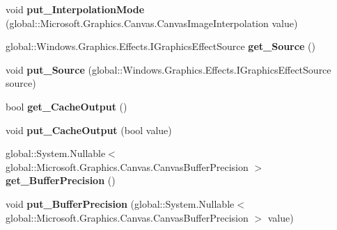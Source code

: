 \begin{DoxyCompactItemize}
void {\bfseries put\+\_\+\+Interpolation\+Mode} (global\+::\+Microsoft.\+Graphics.\+Canvas.\+Canvas\+Image\+Interpolation value)
\item 
\mbox{\label{class_microsoft_1_1_graphics_1_1_canvas_1_1_effects_1_1_straighten_effect_afc5cddafd3cf6b76344d67cd56c344ce}} 
global\+::\+Windows.\+Graphics.\+Effects.\+I\+Graphics\+Effect\+Source {\bfseries get\+\_\+\+Source} ()
\item 
\mbox{\label{class_microsoft_1_1_graphics_1_1_canvas_1_1_effects_1_1_straighten_effect_a7b9aaa626d56da821740097951cd1c38}} 
void {\bfseries put\+\_\+\+Source} (global\+::\+Windows.\+Graphics.\+Effects.\+I\+Graphics\+Effect\+Source source)
\item 
\mbox{\label{class_microsoft_1_1_graphics_1_1_canvas_1_1_effects_1_1_straighten_effect_aa6bcc6219eb494a9aaa6dff927bbf52f}} 
bool {\bfseries get\+\_\+\+Cache\+Output} ()
\item 
\mbox{\label{class_microsoft_1_1_graphics_1_1_canvas_1_1_effects_1_1_straighten_effect_a08dc50002bd2d57a463a37c9e3974833}} 
void {\bfseries put\+\_\+\+Cache\+Output} (bool value)
\item 
\mbox{\label{class_microsoft_1_1_graphics_1_1_canvas_1_1_effects_1_1_straighten_effect_abfba533d30d1a8dd9bbc8cf44a2ef758}} 
global\+::\+System.\+Nullable$<$ global\+::\+Microsoft.\+Graphics.\+Canvas.\+Canvas\+Buffer\+Precision $>$ {\bfseries get\+\_\+\+Buffer\+Precision} ()
\item 
\mbox{\label{class_microsoft_1_1_graphics_1_1_canvas_1_1_effects_1_1_straighten_effect_acea6a807baf9929501caaf88883d25ef}} 
void {\bfseries put\+\_\+\+Buffer\+Precision} (global\+::\+System.\+Nullable$<$ global\+::\+Microsoft.\+Graphics.\+Canvas.\+Canvas\+Buffer\+Precision $>$ value)
\item 
\mbox{\label{class_microsoft_1_1_graphics_1_1_canvas_1_1_effects_1_1_straighten_effect_af981771f6d76ef68906d2f4f9fd106a6}} 

\end{DoxyCompactItemize}
